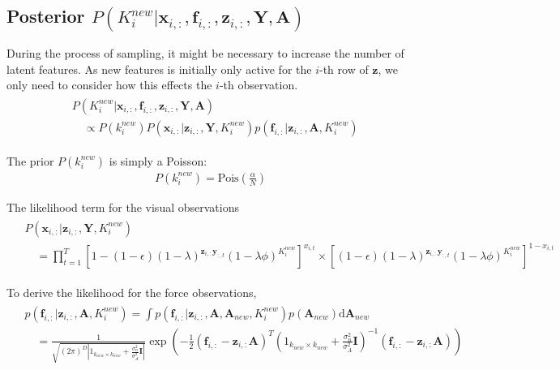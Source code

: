 \documentclass[]{article}
\begin{document}
\subsection{Posterior $P(K^{new}_i | \mathbf{x}_{i,:},  \mathbf{f}_{i,:}, \mathbf{z}_{i,: }, \mathbf{Y}, \mathbf{A}) $}
During the process of sampling, it might be necessary to increase the number of latent features. As new features is initially only active for the $i$-th row of $\mathbf{z}$, we only need to consider how this effects the $i$-th observation. 
	\begin{align}
		\begin{split}\label{eq:posterior_Knew}
		&P(K^{new}_i | \mathbf{x}_{i,:},  \mathbf{f}_{i,:}, \mathbf{z}_{i,: }, \mathbf{Y}, \mathbf{A}) \\
		&\quad \propto P(k^{new}_i) P(\mathbf{x}_{i,:}| \mathbf{z}_{i,:}, \mathbf{Y}, K^{new}_i) p(\mathbf{f}_{i,:}|\mathbf{z}_{i,:}, \mathbf{A}, K^{new}_i)
	\end{split}
	\end{align}

The prior $P(k^{new}_i)$ is simply a Poisson:
\begin{align}
	P(k^{new}_i) = \text{Pois}\left(\frac{\alpha}{N}\right)
\end{align}
	
The likelihood term for the visual observations
	\begin{align}
		\begin{split}
			&P(\mathbf{x}_{i,:}| \mathbf{z}_{i,:}, \mathbf{Y}, K^{new}_i) \\
			&\quad=  \prod_{t=1}^{T} \left[1 - (1-\epsilon)(1-\lambda)^{\mathbf{z}_{i,:}\mathbf{y}_{:,t}}(1-\lambda\phi)^{K^{new}_i}\right]^{x_{i,t}} \times \left[ (1-\epsilon)(1-\lambda)^{\mathbf{z}_{i,:}\mathbf{y}_{:,t}}(1-\lambda\phi)^{K^{new}_i}\right]^{1 - x_{i,t}} 
		\end{split}
	\end{align}
	
To derive the likelihood for the force observations, 
 	\begin{align}
 		\begin{split}
 			&p(\mathbf{f}_{i,:}|\mathbf{z}_{i,:}, \mathbf{A}, K^{new}_i) = \int p(\mathbf{f}_{i,:}|\mathbf{z}_{i,:}, \mathbf{A}, \mathbf{A}_{new}, K^{new}_i)p(\mathbf{A}_{new}) \text{d} \mathbf{A}_{new} \\
 			&\quad= \frac{1}{\sqrt{(2\pi)^D |1_{k_{new}\times k_{new}} + \frac{\sigma^2_n}{\sigma^2_A}\mathbf{I}|}}	\exp \left(-\frac{1}{2} (\mathbf{f}_{i,:} - \mathbf{z}_{i,:} \mathbf{A})^T \left(1_{k_{new}\times k_{new}} + \frac{\sigma^2_n}{\sigma^2_A}\mathbf{I}\right)^{-1} (\mathbf{f}_{i,:} - \mathbf{z}_{i,:} \mathbf{A}) \right)
 		\end{split}
 	\end{align}
\end{document}
